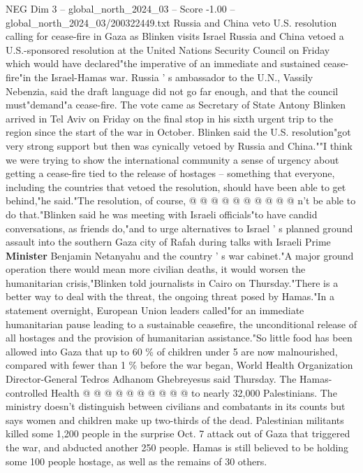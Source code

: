 \begin{textsample}{NEG Dim 3 – global\_north\_2024\_03 – Score -1.00 – global\_north\_2024\_03/200322449.txt}  \label{ex:f3_neg_181}
Russia and China veto U.S. resolution calling for cease-fire in Gaza as Blinken visits Israel Russia and China vetoed a U.S.-sponsored resolution at the United Nations Security Council on Friday which would have declared"the imperative of an immediate and sustained cease-fire"in the Israel-Hamas war.
Russia ' s ambassador to the U.N., Vassily Nebenzia, said the draft language did not go far enough, and that the council must"demand"a cease-fire.
The vote came as Secretary of State Antony Blinken arrived in Tel Aviv on Friday on the final stop in his sixth urgent trip to the region since the start of the war in October.
Blinken said the U.S. resolution"got very strong support but then was cynically vetoed by Russia and China.""I think we were trying to show the international community a sense of urgency about getting a cease-fire tied to the release of hostages -- something that everyone, including the countries that vetoed the resolution, should have been able to get behind,"he said."The resolution, of course, @ @ @ @ @ @ @ @ @ @ n't be able to do that."Blinken said he was meeting with Israeli officials"to have candid conversations, as friends do,"and to urge alternatives to Israel ' s planned ground assault into the southern Gaza city of Rafah during talks with Israeli Prime \textbf{Minister} Benjamin Netanyahu and the country ' s war cabinet."A major ground operation there would mean more civilian deaths, it would worsen the humanitarian crisis,"Blinken told journalists in Cairo on Thursday."There is a better way to deal with the threat, the ongoing threat posed by Hamas."In a statement overnight, European Union leaders called"for an immediate humanitarian pause leading to a sustainable ceasefire, the unconditional release of all hostages and the provision of humanitarian assistance."So little food has been allowed into Gaza that up to 60 \% of children under 5 are now malnourished, compared with fewer than 1 \% before the war began, World Health Organization Director-General Tedros Adhanom Ghebreyesus said Thursday.
The Hamas-controlled Health @ @ @ @ @ @ @ @ @ @ to nearly 32,000 Palestinians.
The ministry doesn't distinguish between civilians and combatants in its counts but says women and children make up two-thirds of the dead.
Palestinian militants killed some 1,200 people in the surprise Oct. 7 attack out of Gaza that triggered the war, and abducted another 250 people.
Hamas is still believed to be holding some 100 people hostage, as well as the remains of 30 others.

\end{textsample}
